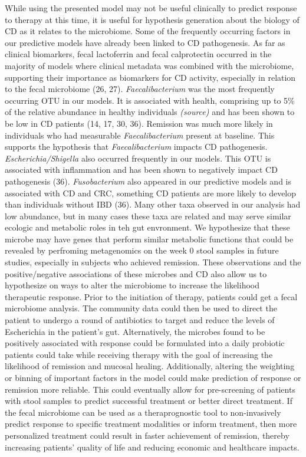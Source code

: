 \documentclass[11pt,]{article}
\begin{document}
While using the presented model may not be useful clinically to predict
response to therapy at this time, it is useful for hypothesis generation
about the biology of CD as it relates to the microbiome. Some of the
frequently occurring factors in our predictive models have already been
linked to CD pathogenesis. As far as clinical biomarkers, fecal
lactoferrin and fecal calprotectin occurred in the majority of models
where clinical metadata was combined with the microbiome, supporting
their importance as biomarkers for CD activity, especially in relation
to the fecal microbiome (26, 27). \emph{Faecalibacterium} was the most
frequently occurring OTU in our models. It is associated with health,
comprising up to 5\% of the relative abundance in healthy individuals
\emph{(source)} and has been shown to be low in CD patients (14, 17, 30,
36). Remission was much more likely in individuals who had measurable
\emph{Faecalibacterium} present at baseline. This supports the
hypothesis that \emph{Faecalibacterium} impacts CD pathogenesis.
\emph{Escherichia/Shigella} also occurred frequently in our models. This
OTU is associated with inflammation and has been shown to negatively
impact CD pathogenesis (36). \emph{Fusobacterium} also appeared in our
predictive models and is associated with CD and CRC, something CD
patients are more likely to develop than individuals without IBD (36).
Many other taxa observed in our analysis had low abundance, but in many
cases these taxa are related and may serve similar ecologic and
metabolic roles in teh gut envronment. We hypothesize that these microbe
may have genes that perform similar metabolic functions that could be
revealed by perfroming metagenomics on the week 0 stool samples in
future studies, especially in subjects who achieved remission. These
observations and the positive/negative associations of these microbes
and CD also allow us to hypothesize on ways to alter the microbiome to
increase the likelihood therapeutic response. Prior to the initiation of
therapy, patients could get a fecal microbiome analysis. The community
data could then be used to direct the patient to undergo a round of
antibiotics to target and reduce the levels of Escherichia in the
patient's gut. Alternatively, the microbes found to be positively
associated with response could be formulated into a daily probiotic
patients could take while receiving therapy with the goal of increasing
the likelihood of remission and mucosal healing. Additionally, altering
the weighting or binning of important factors in the model could make
prediction of response or remission more reliable. This could eventually
allow for pre-screening of patients with stool samples to predict
successful treatment or better direct treatment. If the fecal microbiome
can be used as a theraprognostic tool to non-invasively predict response
to specific treatment modalities or inform treatment, then more
personalized treatment could result in faster achievement of remission,
thereby increasing patients' quality of life and reducing economic and
healthcare impacts.
\end{document}
